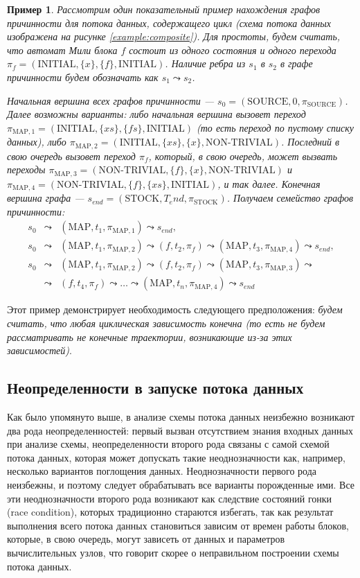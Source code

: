 \documentclass[10pt,a4paper]{article}
\newtheorem{example}{Пример}
\newcommand{\stock}{\text{STOCK}}
\newcommand{\source}{\text{SOURCE}}
\newcommand{\initial}{\text{INITIAL}}
\newcommand{\nontrivial}{\text{NON-TRIVIAL}}
\newcommand{\map}{\text{MAP}}
\begin{document}
  \begin{example}
  \label{map_example}
  Рассмотрим один показательный пример нахождения графов причинности для потока данных, содержащего цикл (схема потока данных изображена на рисунке \ref{example:composite}).
  Для простоты, будем считать, что автомат Мили блока $f$ состоит из одного состояния и одного перехода $\pi_f = (\initial, \{x\}, \{f\}, \initial)$.  
  Наличие ребра из $s_1$ в $s_2$ в графе причинности будем обозначать как $s_1 \leadsto s_2$.
  
  Начальная вершина всех графов причинности --- $s_0 = (\source, 0, \pi_{\source})$. Далее возможны варианты: либо начальная вершина вызовет переход
  $\pi_{\map, 1} = (\initial, \{xs\}, \{fs\}, \initial)$ (то есть переход по пустому списку данных), либо $\pi_{\map, 2} = (\initial, \{xs\}, \{x\}, \nontrivial)$.
  Последний в свою очередь вызовет переход $\pi_f$, который, в свою очередь, может вызвать переходы
  $\pi_{\map, 3} = (\nontrivial, \{f\}, \{x\}, \nontrivial)$ и $\pi_{\map, 4} = (\nontrivial, \{f\}, \{xs\}, \initial)$, и так далее.
  Конечная вершина графа --- $s_{end} = (\stock, T_end, \pi_{\stock})$.
  Получаем семейство графов причинности:
  \begin{eqnarray*}
    s_0 & \leadsto & (\map, t_1, \pi_{\map, 1}) \leadsto s_{end}, \\
    s_0 & \leadsto & (\map, t_1, \pi_{\map, 2}) \leadsto (f, t_2, \pi_f) \leadsto (\map, t_3, \pi_{\map, 4}) \leadsto s_{end}, \\
    s_0 & \leadsto & (\map, t_1, \pi_{\map, 2}) \leadsto (f, t_2, \pi_f) \leadsto (\map, t_3, \pi_{\map, 3}) \leadsto \\
    & \leadsto & (f, t_4, \pi_f) \leadsto \dots \leadsto (\map, t_n, \pi_{\map, 4}) \leadsto s_{end}
  \end{eqnarray*}
  
  \end{example}
  
  Этот пример демонстрирует необходимость следующего предположения:
  \textit{будем считать, что любая циклическая зависимость конечна (то есть не будем рассматривать не конечные траектории, возникающие из-за этих зависимостей)}.
  
\subsection{Неопределенности в запуске потока данных}
  Как было упомянуто выше, в анализе схемы потока данных неизбежно возникают два рода неопределенностей: первый вызван отсутствием знания входных данных при анализе схемы,
  неопределенности второго рода связаны с самой схемой потока данных, которая может допускать такие неоднозначности как, например, несколько вариантов поглощения данных.
  Неоднозначности первого рода неизбежны, и поэтому следует обрабатывать все варианты порожденные ими.
  Все эти неоднозначности второго рода возникают как следствие состояний гонки (race condition), которых традиционно стараются избегать,
  так как результат выполнения всего потока данных становиться зависим от времен работы блоков, которые, в свою очередь, могут зависеть от данных и
  параметров вычислительных узлов, что говорит скорее о неправильном построении схемы потока данных.
  
\end{document}

